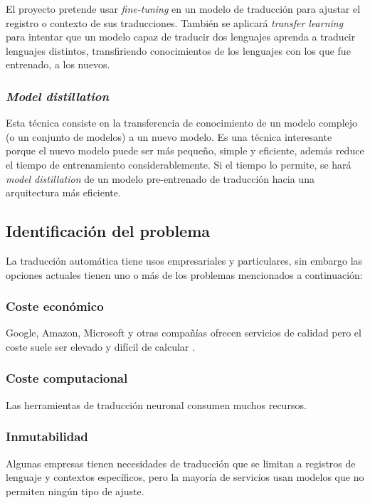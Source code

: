El proyecto pretende usar \textit{fine-tuning} en un modelo de traducción para ajustar el registro
o contexto de sus traducciones. También se aplicará \textit{transfer learning} para intentar que un modelo
capaz de traducir dos lenguajes aprenda a traducir lenguajes distintos, transfiriendo conocimientos de los
lenguajes con los que fue entrenado, a los nuevos.

\subsubsection*{\textit{Model distillation}}
Esta técnica consiste en la transferencia de conocimiento de un modelo complejo (o un conjunto de modelos)
a un nuevo modelo.
Es una técnica interesante porque el nuevo modelo puede ser más pequeño, simple y eficiente,
además reduce el tiempo de entrenamiento considerablemente.
Si el tiempo lo permite, se hará \textit{model distillation} de un modelo pre-entrenado de traducción
hacia una arquitectura más eficiente.




\subsection{Identificación del problema}\label{problem}
La traducción automática tiene usos empresariales y particulares, sin embargo las opciones
actuales tienen uno o más de los problemas mencionados a continuación:

\subsubsection*{Coste económico}
Google, Amazon, Microsoft y otras compañías ofrecen servicios de calidad pero el coste
suele ser elevado y difícil de calcular
\cite{GoogleTranslatePricing,AWSTranslatePricing,MicrosoftTranslatePricing}.

\subsubsection*{Coste computacional}
Las herramientas de traducción neuronal consumen muchos recursos.

\subsubsection*{Inmutabilidad}
Algunas empresas tienen necesidades de traducción que se limitan a registros de
lenguaje y contextos específicos, pero la mayoría de servicios usan modelos que no
permiten ningún tipo de ajuste.

